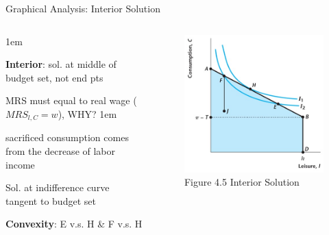 \documentclass[11pt,aspectratio=43]{beamer}
\let\olditemize=\itemize
\let\endolditemize=\enditemize
\renewenvironment{itemize}{\olditemize \itemsep1em}{\endolditemize}
\theoremstyle{definition}
\begin{document}
\begin{frame}{Graphical Analysis: Interior Solution}
\label{slide:Graphical_Analysis__Interior_Solution}
    \begin{columns}
        \begin{column}{0.5\textwidth}
            \begin{itemize}
                \item \textbf{Interior}: sol. at middle of budget set, not end pts
                \item \alert{MRS} must equal to \alert{real wage} ($MRS_{l, C} = w$), WHY?
                \begin{itemize}
                    \item sacrificed consumption comes from the decrease of labor income
                \end{itemize}
                \item Sol. at indifference curve \alert{tangent} to budget set
                \item \textbf{Convexity}: E v.s. H \& F v.s. H
            \end{itemize}
        \end{column}
        \begin{column}{0.5\textwidth}
            \begin{figure}
                \caption{Figure 4.5 Interior Solution}
                \includegraphics[width=\textwidth]{./figures/Figure4_5.jpg}
            \end{figure}
        \end{column}
    \end{columns}
\end{frame}
\end{document}
